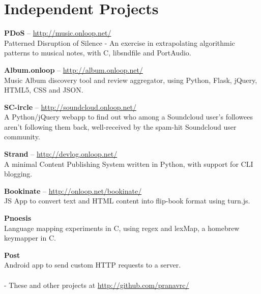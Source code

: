 \documentclass[10pt,a4paper]{moderncv}
\begin{document}

\section{Independent Projects}

\cvlistitem
{\textbf{PDoS} -- {{\href{http://music.onloop.net/}{\small http://music.onloop.net/}}}
  \\Patterned Disruption of Silence - An exercise in extrapolating algorithmic patterns to musical notes, with C, libsndfile and PortAudio.}

\cvlistitem
{\textbf{Album.onloop} -- {{\href{http://album.onloop.net/}{\small http://album.onloop.net/}}}
  \\Music Album discovery tool and review aggregator, using Python, Flask, jQuery, HTML5, CSS and JSON.}

\cvlistitem
{\textbf{SC-ircle} -- {{\href{http://soundcloud.onloop.net/}{\small http://soundcloud.onloop.net/}}}
  \\A Python/jQuery webapp to find out who among a Soundcloud user's followees aren't following them back, well-received by the spam-hit Soundcloud user community.}

\cvlistitem
{\textbf{Strand} -- {{\href{http://devlog.onloop.net}{\small http://devlog.onloop.net/}}}
  \\A minimal Content Publishing System written in Python, with support for CLI blogging.}

\cvlistitem
{\textbf{Bookinate} -- {{\href{http://onloop.net/bookinate}{\small http://onloop.net/bookinate/}}}
  \\JS App to convert text and HTML content into flip-book format using turn.js.}

\cvlistitem
{\textbf{Pnoesis}
  \\Language mapping experiments in C, using regex and lexMap, a homebrew keymapper in C.}

\cvlistitem
{\textbf{Post}
 \\Android app to send custom HTTP requests to a server.\\\\ - These and other projects at {\href{http://github.com/pranavrc}{http://github.com/pranavrc/}}}


\end{document}
